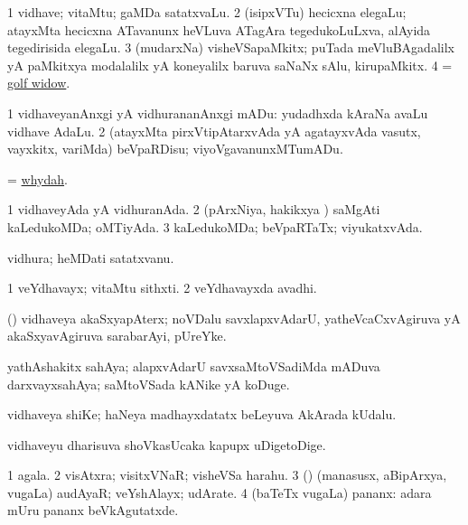 \bentry
{} 
\gl{\nA}
\expl{}
\bmng
\bnum
\num{1} vidhave; vitaMtu; gaMDa satatxvaLu. 
\num{2} (isipxVTu) hecicxna elegaLu; atayxMta hecicxna ATavanunx heVLuva ATagAra tegedukoLuLxva, alAyida tegedirisida elegaLu. 
\num{3} (mudarxNa) visheVSapaMkitx; puTada meVluBAgadalilx yA paMkitxya modalalilx yA koneyalilx baruva saNaNx sAlu, kirupaMkitx. 
\num{4} = \hyperref{kandict_g.pdf}{G}{golf widow}{golf widow}. 
\enum
\emng
\eentry

\bentry
{} 
\gl{\sakirx}
\bmng
\bnum
\num{1} vidhaveyanAnxgi yA vidhurananAnxgi mADu:  yudadhxda kAraNa avaLu vidhave AdaLu. 
\num{2} (atayxMta pirxVtipAtarxvAda yA agatayxvAda vasutx, vayxkitx, \mo variMda) beVpaRDisu; viyoVgavanunxMTumADu. 
\enum
\emng
\eentry

\bentry
{}
\gl{\nA}
\bmng
= \hyperlink{whydah}{whydah}. 
\emng
\eentry

\bentry
{}
\gl{\gu}
\bmng
\bnum
\num{1} vidhaveyAda yA vidhuranAda. 
\num{2} (pArxNiya, hakikxya \vi) saMgAti kaLedukoMDa; oMTiyAda. 
\num{3} kaLedukoMDa; beVpaRTaTx; viyukatxvAda. 
\enum
\emng
\eentry

\bentry
{}
\gl{\nA}
\bmng
vidhura; heMDati satatxvanu. 
\emng
\eentry

\bentry
{}
\gl{\nA}
\bmng
\bnum
\num{1} veYdhavayx; vitaMtu sithxti.
\num{2} veYdhavayxda avadhi. 
\enum
\emng
\eentry

\bentry
{}
\gl{\nA}
\bmng
(\beY) vidhaveya akaSxyapAterx; noVDalu savxlapxvAdarU, yatheVcaCxvAgiruva yA akaSxyavAgiruva sarabarAyi, pUreYke. 
\emng
\eentry

\bentry
{}
\gl{\nA}
\bmng
yathAshakitx sahAya; alapxvAdarU savxsaMtoVSadiMda mADuva darxvayxsahAya; saMtoVSada kANike yA koDuge. 
\emng
\eentry

\bentry
{}
\gl{\nA}
\bmng
vidhaveya shiKe; haNeya madhayxdatatx beLeyuva  AkArada kUdalu. 
\emng
\eentry

\bentry
{}
\gl{\nA}
\bmng
vidhaveyu dharisuva shoVkasUcaka kapupx uDigetoDige. 
\emng
\eentry

\bentry
{} 
\gl{\nA}
\expl{}
\bmng
\bnum
\num{1} agala. 
\num{2} visAtxra; visitxVNaR; visheVSa harahu. 
\num{3} (\rUpa) (manasusx, aBipArxya, \mo vugaLa) audAyaR; veYshAlayx; udArate. 
\num{4} (baTeTx \mo vugaLa) pananx:  adara mUru pananx beVkAgutatxde. 
\enum
\emng
\eentry

